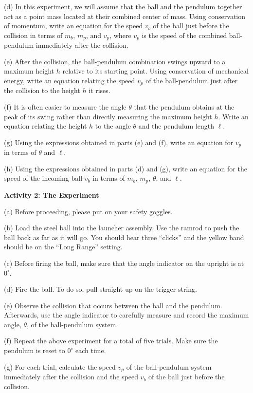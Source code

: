 (d) In this experiment, we will assume that the ball and the pendulum together act as a point mass located at their combined center of mass. Using conservation of momentum, write an equation for the speed $v_b$ of the ball just before the collision in terms of $m_b$, $m_p$, and $v_p$, where $v_p$ is the speed of the combined ball-pendulum immediately after the collision.
\answerspace{20mm}

(e) After the collision, the ball-pendulum combination swings upward to a maximum height $h$ relative to its starting point. Using conservation of mechanical energy, write an equation relating the speed $v_p$ of the ball-pendulum just after the collision to the height $h$ it rises.
\answerspace{20mm}

(f) It is often easier to measure the angle $\theta$ that the pendulum obtains at the peak of its swing rather than directly measuring the maximum height $h$. Write an equation relating the height $h$ to the angle $\theta$ and the pendulum length $\ell$.
\answerspace{20mm}

(g) Using the expressions obtained in parts (e) and (f), write an equation for $v_p$ in terms of $\theta$ and $\ell$.
\answerspace{20mm}

(h) Using the expressions obtained in parts (d) and (g), write an equation for the speed of the incoming ball $v_b$ in terms of $m_b$, $m_p$, $\theta$, and $\ell$.
\answerspace{20mm}

\textbf{Activity 2: The Experiment}

(a) Before proceeding, please put on your safety goggles.

(b) Load the steel ball into the launcher assembly. Use the ramrod to push the ball back as far as it will go. You should hear three ``clicks'' and the yellow band should be on the ``Long Range'' setting.

(c) Before firing the ball, make sure that the angle indicator on the upright is at $0^\circ$.

(d) Fire the ball. To do so, pull straight up on the trigger string.

(e) Observe the collision that occurs between the ball and the pendulum. Afterwards, use
the angle indicator to carefully measure and record the maximum angle, $\theta$, of the
ball-pendulum system. 

(f) Repeat the above experiment for a total of five trials. Make sure the pendulum is reset to $0^\circ$ each time.

(g) For each trial, calculate the speed $v_p$ of the ball-pendulum system immediately after the collision and the speed $v_b$ of the ball just before the collision.

